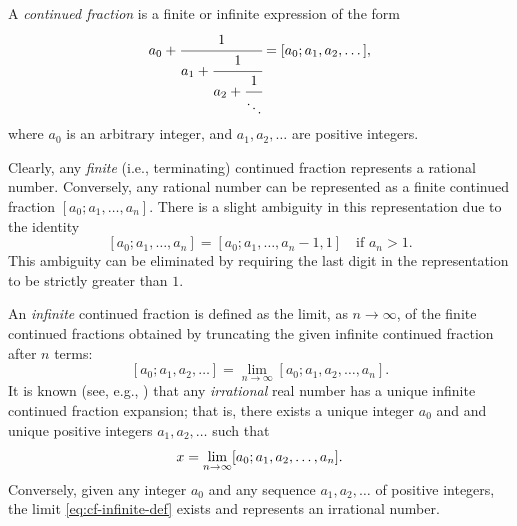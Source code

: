 \documentclass[10pt]{article}
\theoremstyle{definition}
\numberwithin{equation}{section}
\numberwithin{lemma}{section}
\begin{document}
A \emph{continued fraction} is a finite or infinite expression of the form
\begin{equation}
\label{eq:cf-def1}
a_0+\cfrac{1}{a_1+\cfrac{1}{a_2+\cfrac{1}{\ddots}}} = [a_0;
a_1,a_2,\dots],
\end{equation}
where $a_0$ is an arbitrary integer, and $a_1,a_2,\dots $ are positive
integers.

Clearly, any \emph{finite} (i.e., terminating) continued fraction
represents a rational number. Conversely, any rational number can be
represented as a finite continued fraction $[a_0;a_1,\dots,a_n]$.
There is a slight ambiguity in this representation due to the identity 
\begin{equation}
\label{eq:cf-nonuniqueness}
[a_0; a_1,\dots,a_n]=[a_0;a_1,\dots,a_n-1,1]
\quad\text{if $a_n>1$.}
\end{equation}
This ambiguity can be eliminated by requiring the last digit in the
representation to be strictly greater than $1$.




An \emph{infinite} continued fraction is defined as the limit, as
$n\to\infty$,  of the finite continued fractions obtained by truncating
the given infinite continued fraction after $n$ terms:
\begin{equation}
\label{eq:cf-infinite-def}
[a_0;a_1,a_2,\dots]=
\lim_{n\to\infty} [a_0;a_1,a_2,\dots,a_n].
\end{equation}
It is known (see, e.g., \cite[Theorem 5.11]{niven1956})
that any \emph{irrational} real number has a unique infinite
continued fraction expansion; that is, there exists a unique integer
$a_0$ and and unique positive integers  
$a_1,a_2,\dots$ such that
\begin{equation}
\notag
x= \lim_{n\to\infty} [a_0;a_1,a_2,\dots,a_n].
\end{equation}
Conversely, given any integer $a_0$ and any sequence
$a_1,a_2,\dots$ of positive integers, the limit
\eqref{eq:cf-infinite-def} exists and represents an irrational number.
\end{document}
